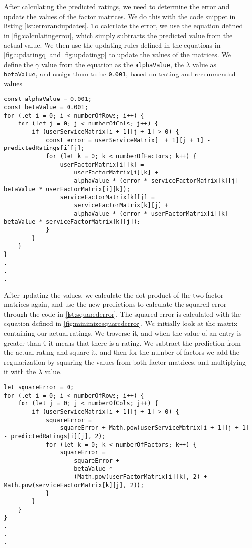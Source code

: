 After calculating the predicted ratings, we need to determine the error and update the values of the factor matrices.
We do this with the code snippet in listing \autoref{lst:errorandupdates}.
To calculate the error, we use the equation defined in \autoref{fig:calculatingerror}, which simply subtracts the predicted value from the actual value.
We then use the updating rules defined in the equations in \autoref{fig:updatingq} and \autoref{fig:updatingp} to update the values of the matrices.
We define the $\gamma$ value from the equation as the \texttt{alphaValue}, the $\lambda$ value as \texttt{betaValue}, and assign them to be \texttt{0.001}, based on testing and recommended values.

\begin{lstlisting}[caption={Calculating error and updating values}, captionpos=b, label={lst:errorandupdates}]
const alphaValue = 0.001;
const betaValue = 0.001;
for (let i = 0; i < numberOfRows; i++) {
    for (let j = 0; j < numberOfCols; j++) {
        if (userServiceMatrix[i + 1][j + 1] > 0) {
            const error = userServiceMatrix[i + 1][j + 1] - predictedRatings[i][j];
            for (let k = 0; k < numberOfFactors; k++) {
                userFactorMatrix[i][k] =
                    userFactorMatrix[i][k] +
                    alphaValue * (error * serviceFactorMatrix[k][j] - betaValue * userFactorMatrix[i][k]);
                serviceFactorMatrix[k][j] =
                    serviceFactorMatrix[k][j] +
                    alphaValue * (error * userFactorMatrix[i][k] - betaValue * serviceFactorMatrix[k][j]);
            }
        }
    }
}
.
.
.
\end{lstlisting}
After updating the values, we calculate the dot product of the two factor matrices again, and use the new predictions to calculate the squared error through the code in \autoref{lst:squarederror}.
The squared error is calculated with the equation defined in \autoref{fig:minimizesquarederror}.
We initially look at the matrix containing our actual ratings.
We traverse it, and when the value of an entry is greater than 0 it means that there is a rating.
We subtract the prediction from the actual rating and square it, and then for the number of factors we add the regularization by squaring the values from both factor matrices, and multiplying it with the $\lambda$ value.
\begin{lstlisting}[caption={Calculating the overall squared error}, captionpos=b, label={lst:squarederror}]
let squareError = 0;
for (let i = 0; i < numberOfRows; i++) {
    for (let j = 0; j < numberOfCols; j++) {
        if (userServiceMatrix[i + 1][j + 1] > 0) {
            squareError =
                squareError + Math.pow(userServiceMatrix[i + 1][j + 1] - predictedRatings[i][j], 2);
            for (let k = 0; k < numberOfFactors; k++) {
                squareError =
                    squareError +
                    betaValue *
                    (Math.pow(userFactorMatrix[i][k], 2) + Math.pow(serviceFactorMatrix[k][j], 2));
            }
        }
    }
}
.
.
.
\end{lstlisting}
